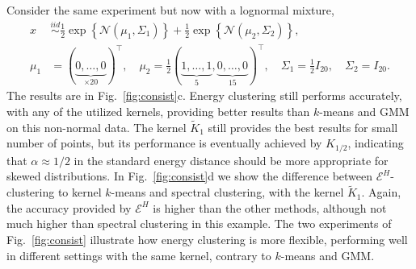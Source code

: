 \documentclass[aps,preprint,nofootinbib,floatfix]{revtex4-1}
\newcommand\kk{K}
\begin{document}
Consider the same experiment but now with a
lognormal mixture, 
\begin{equation}
\label{eq:20loggauss}
\begin{split}
x &\stackrel{iid}{\sim} \tfrac{1}{2} 
\exp\left\{\mathcal{N}(\mu_1,\Sigma_1)\right\}+
\tfrac{1}{2} \exp\left\{\mathcal{N}(\mu_2,\Sigma_2)\right\} , \\
\mu_1 &= (\underbrace{0,\dotsc,0}_{\times 20})^\top ,\quad
\mu_2 = \tfrac{1}{2} 
(\underbrace{1,\dotsc,1}_{5},\underbrace{0,\dotsc,0}_{15})^\top, \quad
\Sigma_1 = \tfrac{1}{2} I_{20},  \quad
\Sigma_2 = I_{20}.
\end{split}
\end{equation}
The results are in Fig.~\ref{fig:consist}c.
Energy clustering still performs accurately, with any of the utilized
kernels, providing better results than $k$-means and GMM on
this non-normal data. The kernel $\widetilde{\kk}_1$ still provides 
the best results for small number of points, 
but its performance is eventually achieved by
$\kk_{1/2}$, indicating that $\alpha \approx 1/2$ in the standard
energy distance should be more appropriate for skewed distributions.
In Fig.~\ref{fig:consist}d we show the difference between 
$\mathcal{E}^H$-clustering to kernel $k$-means and spectral clustering,
with the kernel $\widetilde{\kk}_1$. Again,
the accuracy provided by $\mathcal{E}^H$ is higher than the other methods,
although not much higher than spectral clustering in this example.
The two experiments of Fig.~\ref{fig:consist}
illustrate how energy clustering is more flexible,
performing well in different settings
with the same kernel, contrary to $k$-means and GMM.
\end{document}
